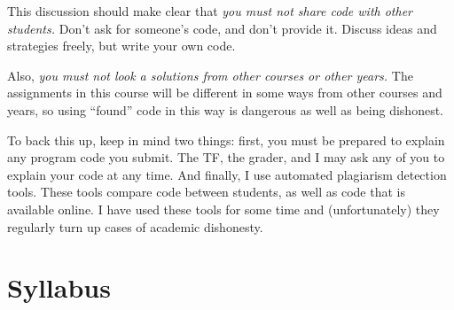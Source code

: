 \documentclass[11pt]{article}
\begin{document}
This discussion should make clear that \emph{you must not share code
  with other students.}  Don't ask for someone's code, and don't provide
  it.  Discuss ideas and strategies freely, but write your own code.

Also, \emph{you must not look a solutions from other courses or other
  years.}  The assignments in this course will be different in some ways
  from other courses and years, so using ``found'' code in this way is
  dangerous as well as being dishonest.

To back this up, keep in mind two things:  first, you must be prepared
to explain any program code you submit.   The TF, the grader, and I may
ask any of you to explain your code at any time.   And finally, I use
automated plagiarism detection tools.  These tools compare code between
students, as well as code that is available online.  I have used these
tools for some time and (unfortunately) they regularly turn up cases of
academic dishonesty.

\newpage
\section*{Syllabus}
\end{document}
